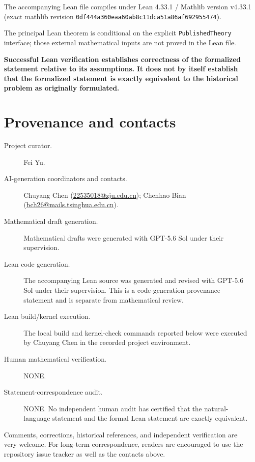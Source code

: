 \documentclass[11pt]{article}
\theoremstyle{definition}
\theoremstyle{remark}
\newcommand{\1}{\mathbf{1}}
\begin{document}
\medskip
\noindent The accompanying Lean file compiles under Lean 4.33.1 / Mathlib version v4.33.1 (exact mathlib revision \texttt{0df444a360eaa60ab8c11dca51a86af692955474}).

\medskip
\noindent The principal Lean theorem is conditional on the explicit \texttt{PublishedTheory} interface; those external mathematical inputs are not proved in the Lean file.

\medskip
\noindent\textbf{Successful Lean verification establishes correctness of the formalized statement relative to its assumptions. It does not by itself establish that the formalized statement is exactly equivalent to the historical problem as originally formulated.}
\endgroup

\section*{Provenance and contacts}
\begingroup\small\sloppy
\begin{description}
\item[Project curator.] Fei Yu.
\item[AI-generation coordinators and contacts.] Chuyang Chen (\href{mailto:22535018@zju.edu.cn}{22535018@zju.edu.cn}); Chenhao Bian (\href{mailto:bch26@mails.tsinghua.edu.cn}{bch26@mails.tsinghua.edu.cn}).
\item[Mathematical draft generation.] Mathematical drafts were generated with GPT-5.6 Sol under their supervision.
\item[Lean code generation.] The accompanying Lean source was generated and revised with GPT-5.6 Sol under their supervision. This is a code-generation provenance statement and is separate from mathematical review.
\item[Lean build/kernel execution.] The local build and kernel-check commands reported below were executed by Chuyang Chen in the recorded project environment.
\item[Human mathematical verification.] NONE.
\item[Statement-correspondence audit.] NONE. No independent human audit has certified that the natural-language statement and the formal Lean statement are exactly equivalent.
\end{description}
\medskip
\noindent Comments, corrections, historical references, and independent verification are very welcome. For long-term correspondence, readers are encouraged to use the repository issue tracker as well as the contacts above.
\endgroup
\end{document}
